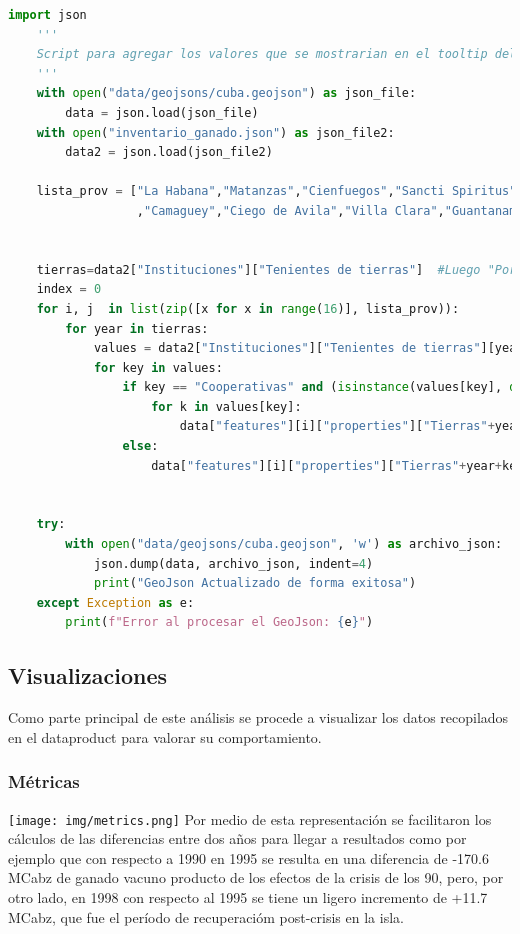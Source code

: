 \documentclass{article}
\begin{document}
\begin{lstlisting}[language=Python, caption=Script para agregar valores al geojson]
    import json 
    '''
    Script para agregar los valores que se mostrarian en el tooltip del mapa al 'data/geojsons/cuba.geojson'
    '''
    with open("data/geojsons/cuba.geojson") as json_file:
        data = json.load(json_file)
    with open("inventario_ganado.json") as json_file2:
        data2 = json.load(json_file2)
    
    lista_prov = ["La Habana","Matanzas","Cienfuegos","Sancti Spiritus","Las Tunas","Holguin","Granma","Santiago de Cuba","Isla de la Juventud"
                  ,"Camaguey","Ciego de Avila","Villa Clara","Guantanamo","Pinar del Rio","Artemisa","Mayabeque"] #Provincias en el orden que aparece en la estructura del GeoJson
    
    
    tierras=data2["Instituciones"]["Tenientes de tierras"]  #Luego "Por Provincias"
    index = 0
    for i, j  in list(zip([x for x in range(16)], lista_prov)):
        for year in tierras:
            values = data2["Instituciones"]["Tenientes de tierras"][year][j]  #Luego "Por Provincias"
            for key in values:
                if key == "Cooperativas" and (isinstance(values[key], dict)):
                    for k in values[key]:
                        data["features"][i]["properties"]["Tierras"+year+k] = values[key][k]   #Luego "Entidades"
                else:
                    data["features"][i]["properties"]["Tierras"+year+key] = values[key]   #Luego "Entidades"
    
    
    try:
        with open("data/geojsons/cuba.geojson", 'w') as archivo_json:
            json.dump(data, archivo_json, indent=4)
            print("GeoJson Actualizado de forma exitosa")
    except Exception as e:
        print(f"Error al procesar el GeoJson: {e}")    
\end{lstlisting}

\newpage

\subsection{Visualizaciones}
Como parte principal de este análisis se procede a visualizar los datos recopilados en el dataproduct para valorar su comportamiento.

\subsubsection{Métricas}
\texttt{[image: img/metrics.png]}
Por medio de esta representación se facilitaron los cálculos de las diferencias entre dos años para llegar a resultados como por ejemplo que con respecto a 1990 en 1995 se 
resulta en una diferencia de -170.6 MCabz de ganado vacuno producto de los efectos de la crisis de los 90, pero, por otro lado, en 1998 con respecto al 1995 se tiene un 
ligero incremento de +11.7 MCabz, que fue el período de recuperacióm post-crisis en la isla.
\end{document}
